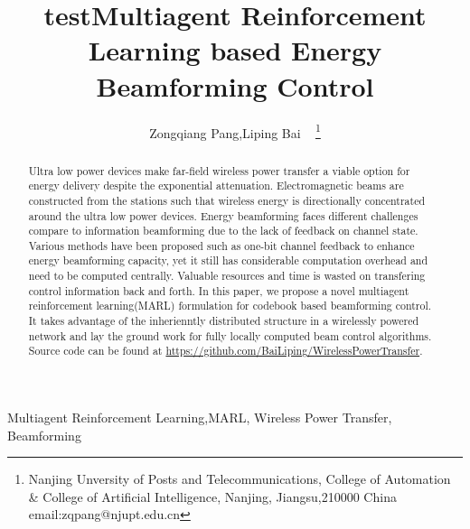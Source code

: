 \documentclass[journal]{IEEEtran}
\begin{document}
    \title{test}
\title{Multiagent Reinforcement Learning based Energy Beamforming Control}
\author{ Zongqiang Pang,Liping Bai ~ \thanks{Nanjing Unversity of Posts and Telecommunications, College of Automation \& College of Artificial Intelligence, Nanjing, Jiangsu,210000 China email:zqpang@njupt.edu.cn}}
\maketitle
\begin{abstract}
Ultra low power devices make far-field wireless power transfer a viable option for energy delivery despite the exponential attenuation. Electromagnetic beams are constructed from the stations such
that wireless energy is directionally concentrated around the ultra low power devices. Energy beamforming faces different challenges compare to information beamforming due to the lack of feedback on channel state. Various methods have been proposed such as one-bit channel feedback to enhance energy beamforming capacity, yet it still has considerable computation overhead and need to be computed centrally. Valuable resources and time is wasted on transfering control information back and forth. In this paper, we propose a novel multiagent reinforcement learning(MARL) formulation for codebook based beamforming control. It takes advantage of the inherienntly distributed structure in a wirelessly powered network and lay the ground work for fully locally computed beam control algorithms. Source code can be found at \url{https://github.com/BaiLiping/WirelessPowerTransfer}.
\end{abstract}
\begin{IEEEkeywords}
Multiagent Reinforcement Learning,MARL, Wireless Power Transfer, Beamforming
\end{IEEEkeywords}
%
\IEEEpeerreviewmaketitle
\end{document}

